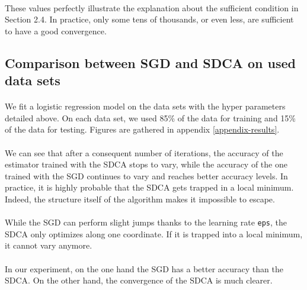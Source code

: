 \documentclass{article}
\begin{document}
\paragraph{}These values perfectly illustrate the explanation about the sufficient condition in Section 2.4. In practice, only some tens of thousands, or even less, are sufficient to have a good convergence.

\subsection{Comparison between SGD and SDCA on used data sets}

\paragraph{}We fit a logistic regression model on the data sets with the hyper parameters detailed above.
On each data set, we used 85\% of the data for training and 15\% of the data for testing. Figures are gathered in appendix \ref{appendix-results}.

\paragraph{}We can see that after a consequent number of iterations, the accuracy of the estimator trained with the SDCA stops to vary, while the accuracy of the one trained with the SGD continues to vary and reaches better accuracy levels. In practice, it is highly probable that the SDCA gets trapped in a local minimum. Indeed, the structure itself of the algorithm makes it impossible to escape.

\paragraph{}While the SGD can perform slight jumps thanks to the learning rate \texttt{eps}, the SDCA only optimizes along one coordinate. If it is trapped into a local minimum, it cannot vary anymore.

\paragraph{}In our experiment, on the one hand the SGD has a better accuracy than the SDCA. On the other hand, the convergence of the SDCA is much clearer.
\end{document}
